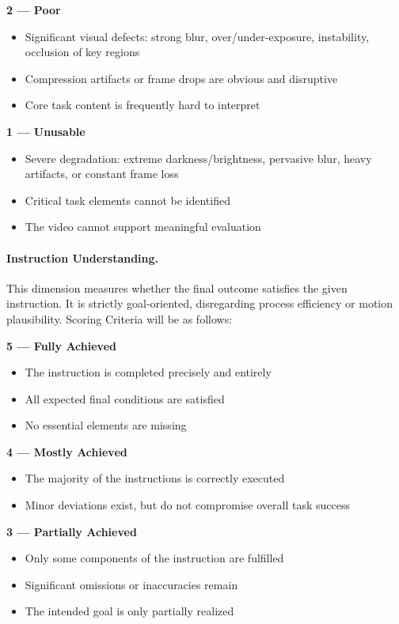 \textbf{2 — Poor}\par
\begin{itemize}
    \item Significant visual defects: strong blur, over/under-exposure, instability, occlusion of key regions
    \item Compression artifacts or frame drops are obvious and disruptive
    \item Core task content is frequently hard to interpret
\end{itemize}

\textbf{1 — Unusable}\par
\begin{itemize}
    \item Severe degradation: extreme darkness/brightness, pervasive blur, heavy artifacts, or constant frame loss
    \item Critical task elements cannot be identified
    \item The video cannot support meaningful evaluation
\end{itemize}

\paragraph{Instruction Understanding.} This dimension measures whether the final outcome satisfies the given instruction.
It is strictly goal-oriented, disregarding process efficiency or motion plausibility.
Scoring Criteria will be as follows:

\textbf{5 — Fully Achieved}\par
\begin{itemize}
    \item The instruction is completed precisely and entirely
    \item All expected final conditions are satisfied
    \item No essential elements are missing
\end{itemize}

\textbf{4 — Mostly Achieved}\par
\begin{itemize}
    \item The majority of the instructions is correctly executed
    \item Minor deviations exist, but do not compromise overall task success
\end{itemize}
 
\textbf{3 — Partially Achieved}\par
\begin{itemize}
    \item Only some components of the instruction are fulfilled
    \item Significant omissions or inaccuracies remain
    \item The intended goal is only partially realized
\end{itemize}

